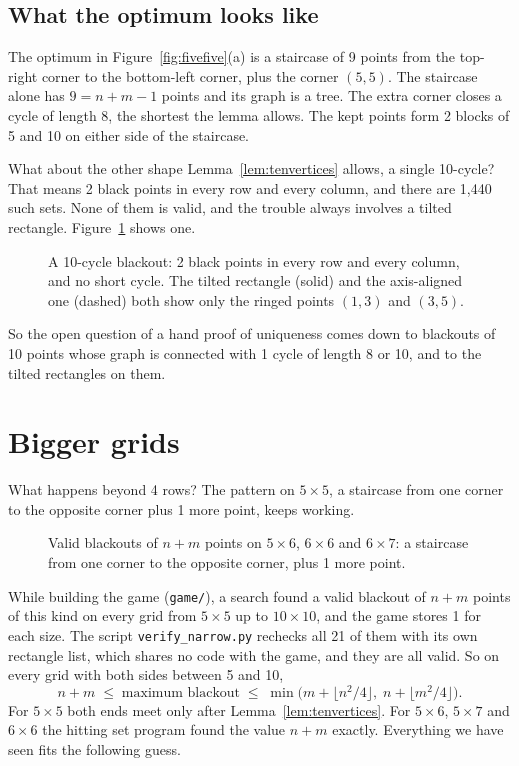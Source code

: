 \documentclass[11pt]{article}
\theoremstyle{definition}
\theoremstyle{remark}
\begin{document}
\subsection{What the optimum looks like}

The optimum in Figure~\ref{fig:fivefive}(a) is a staircase of 9 points from the top-right corner
to the bottom-left corner, plus the corner $(5,5)$. The staircase alone has $9=n+m-1$ points and
its graph is a tree. The extra corner closes a cycle of length 8, the shortest the lemma allows.
The kept points form 2 blocks of 5 and 10 on either side of the staircase.

What about the other shape Lemma~\ref{lem:tenvertices} allows, a single 10-cycle? That means 2
black points in every row and every column, and there are 1,440 such sets. None of them is valid,
and the trouble always involves a tilted rectangle. Figure~\ref{fig:tencycle} shows one.

\begin{figure}[htbp]
\centering

\caption{A 10-cycle blackout: 2 black points in every row and every column, and no short cycle.
The tilted rectangle (solid) and the axis-aligned one (dashed) both show only the ringed points
$(1,3)$ and $(3,5)$.}
\label{fig:tencycle}
\end{figure}

So the open question of a hand proof of uniqueness comes down to blackouts of 10 points whose
graph is connected with 1 cycle of length 8 or 10, and to the tilted rectangles on them.

\section{Bigger grids}\label{sec:bigger}

What happens beyond 4 rows? The pattern on $5\times5$, a staircase from one corner to the
opposite corner plus 1 more point, keeps working.

\begin{figure}[htbp]
\centering

\caption{Valid blackouts of $n+m$ points on $5\times6$, $6\times6$ and $6\times7$: a staircase
from one corner to the opposite corner, plus 1 more point.}
\label{fig:stairs}
\end{figure}

While building the game (\texttt{game/}), a search found a valid blackout of $n+m$ points of this
kind on every grid from $5\times5$ up to $10\times10$, and the game stores 1 for each size. The
script \texttt{verify\_narrow.py} rechecks all 21 of them with its own rectangle list, which shares
no code with the game, and they are all valid. So on every grid with both sides between 5 and 10,
\[
n+m\;\le\;\text{maximum blackout}\;\le\;\min\bigl(m+\lfloor n^2/4\rfloor,\;n+\lfloor m^2/4\rfloor\bigr).
\]
For $5\times5$ both ends meet only after Lemma~\ref{lem:tenvertices}. For $5\times6$, $5\times7$
and $6\times6$ the hitting set program found the value $n+m$ exactly. Everything we have seen
fits the following guess.
\end{document}
